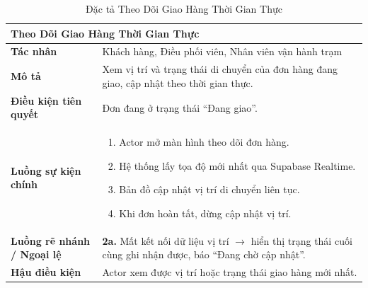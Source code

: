 \begin{table}[H]
  \centering
  \begin{tabularx}{\textwidth}{|l|X|}
    \hline
    \multicolumn{2}{|l|}{\textbf{Theo Dõi Giao Hàng Thời Gian Thực}} \\
    \hline
    \textbf{Tác nhân}           & Khách hàng, Điều phối viên, Nhân viên vận hành trạm \\ \hline
    \textbf{Mô tả}              & Xem vị trí và trạng thái di chuyển của đơn hàng đang giao, cập nhật theo thời gian thực. \\ \hline
    \textbf{Điều kiện tiên quyết} & Đơn đang ở trạng thái ``Đang giao''. \\ \hline
    \textbf{Luồng sự kiện chính} &
      \begin{enumerate}[leftmargin=*, nosep, topsep=0pt]
        \item Actor mở màn hình theo dõi đơn hàng.
        \item Hệ thống lấy tọa độ mới nhất qua Supabase Realtime.
        \item Bản đồ cập nhật vị trí di chuyển liên tục.
        \item Khi đơn hoàn tất, dừng cập nhật vị trí.
      \end{enumerate} \\ \hline
    \textbf{Luồng rẽ nhánh / Ngoại lệ} &
      \textbf{2a.} Mất kết nối dữ liệu vị trí $\rightarrow$ hiển thị trạng thái cuối cùng ghi nhận được, báo ``Đang chờ cập nhật''. \\ \hline
    \textbf{Hậu điều kiện}      & Actor xem được vị trí hoặc trạng thái giao hàng mới nhất. \\
    \hline
  \end{tabularx}
  \caption{Đặc tả Theo Dõi Giao Hàng Thời Gian Thực}
  \label{tab:uc08}
\end{table}

